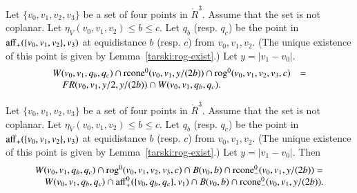 \begin{tarskidata}
\begin{tarski}
\begin{proved}
\swallowed\end{proved}
\end{tarski}





\begin{tarski}

\begin{lemma}
Let $\{v_0,v_1,v_2,v_3\}$ be a set of four points in $\ring{R}^3$.
Assume that the set is not coplanar.
Let $\eta_V(v_0,v_1,v_2)\le b \le c$.  
Let $q_b$ (resp. $q_c$) be the point
in ${\operatorname{aff}}_+(\{v_0,v_1,v_2\},v_3)$ at equidistance $b$ (resp. $c$)
from $v_0,v_1,v_2$.  (The unique existence of this point is given
by Lemma~\ref{tarski:rog-exist}.)   Let $y = |v_1-v_0|$.
$$
\begin{array}{lll}
W(v_0,v_1,q_b,q_c) \cap {\operatorname{rcone}}^0(v_0,v_1,y/(2b))
\cap {\operatorname{rog}}^0(v_0,v_1,v_2,v_3,c) &=\\
\quad FR(v_0,v_1,y/2,y/(2b))\cap W(v_0,v_1,q_b,q_c).
\end{array}
$$
\end{lemma}

\begin{proved}
\swallowed\end{proved}
\end{tarski}





\begin{tarski}

\begin{lemma}
Let $\{v_0,v_1,v_2,v_3\}$ be a set of four points in $\ring{R}^3$.
Assume that the set is not coplanar.
Let $\eta_V(v_0,v_1,v_2)\le b \le c$.  
Let $q_b$ (resp. $q_c$) be the point
in ${\operatorname{aff}}_+(\{v_0,v_1,v_2\},v_3)$ at equidistance $b$ (resp. $c$)
from $v_0,v_1,v_2$.  (The unique existence of this point is given
by Lemma~\ref{tarski:rog-exist}.)   Let $y = |v_1-v_0|$.
Then
$$
\begin{array}{lll}
W(v_0,v_1,q_b,q_c)  \cap {\operatorname{rog}}^0(v_0,v_1,v_2,v_3,c)\cap
B(v_0,b) \cap {\operatorname{rcone}}_-^0(v_0,v_1,y/(2b)) =\\
\quad
W(v_0,v_1,q_b,q_c)  \cap {\operatorname{aff}}_+^0(\{v_0,q_b,q_c\},v_1)\cap
B(v_0,b) \cap {\operatorname{rcone}}_-^0(v_0,v_1,y/(2b)).
\end{array}
$$
\end{lemma}


\end{tarski}
\end{tarskidata}
